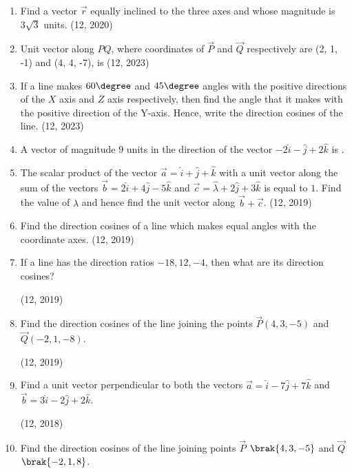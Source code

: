 \begin{enumerate}[label=\thesubsection.\arabic*,  ref=\thesubsection.\theenumi]
\item Find a vector $\overrightarrow{r}$ equally inclined to the three axes and whose magnitude is $3\sqrt{3}$ units.
\hfill (12,  2020)
    \item Unit vector along $PQ$,  where coordinates of $\vec{P}$ and $\vec{Q}$ respectively are (2, 1, -1) and (4, 4, -7),  is
    \hfill (12,  2023)
    \item If a line makes $60\degree$ and $45\degree$ angles with the positive directions of the $X$ axis and $Z$ axis respectively, then find the angle that it makes with the positive direction of the Y-axis. Hence, write the direction cosines of the line.
    \hfill (12, 2023)
    \item A vector of magnitude $9$ units in the direction of the vector $-2\hat{i} - \hat{j} + 2\hat{k}$ is \underline{\hspace{1cm}}.
	\item The scalar product of the vector $\overrightarrow{a} = \hat{i} + \hat{j} + \hat{k}$ with a unit vector along the sum of the vectors $\overrightarrow{b} = 2\hat{i} + 4\hat{j} - 5\hat{k}$ and $\overrightarrow{c} = \hat{\lambda} + 2\hat{j} + 3\hat{k}$ is equal to $1$. Find the value of $\lambda$ and hence find the unit vector along $\overrightarrow{b} + \overrightarrow{c}$. \hfill (12, 2019)
	\item Find the direction cosines of a line which makes equal angles with the coordinate axes. \hfill (12, 2019)
	\item If a line has the direction ratios $-18, 12, -4$, then what are its direction cosines? 

		\hfill (12, 2019)
	\item Find the direction cosines of the line joining the points $\vec{P}(4, 3, -5)$ and $\vec{Q}(-2, 1, -8)$.

		\hfill (12, 2019)
\item Find a unit vector perpendicular to both the vectors $\overrightarrow{a} = \hat{i} - 7\hat{j} + 7\hat{k}$ and $\overrightarrow{b} = 3\hat{i} - 2\hat{j} + 2\hat{k}$.

	\hfill (12, 2018)
\item Find the direction cosines of the line joining points $\vec{P}$ $\brak{4,3,-5}$ and $\vec{Q}$ $\brak{-2,1,8}$.


\end{enumerate}
